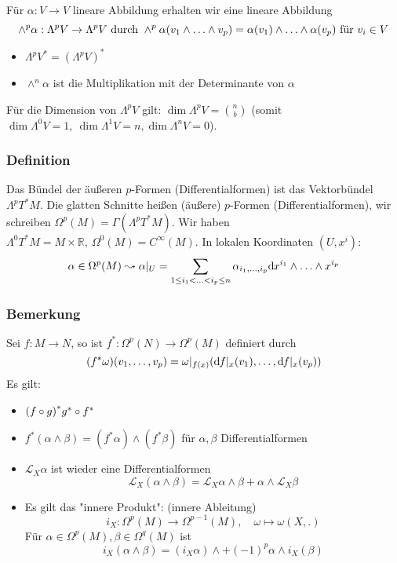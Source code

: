 Für $\alpha: V\to V$ lineare Abbildung erhalten wir eine lineare Abbildung
\[
\wedge^p \alpha: \Lambda^p V \to \Lambda^p V\ \text{durch}\ \wedge^p \alpha\enbrace{v_1\wedge \ldots \wedge v_p} = \alpha(v_1)\wedge \ldots \wedge \alpha(v_p)\ \text{für}\ v_i\in V
\]
\begin{itemize}
\item $\Lambda^p V^* = (\Lambda^p V)^*$
\item $\wedge^n \alpha$ ist die Multiplikation mit der Determinante von $\alpha$
\end{itemize}
Für die Dimension von $\Lambda^p V$ gilt: $\dim \Lambda^p V = \binom{n}{b}$ (somit $\dim \Lambda^0 V = 1,\ \dim \Lambda^1 V = n, \dim \Lambda^n V = 0$).

\subsubsection{Definition}
\label{ssub:189}
Das Bündel der äußeren $p$-Formen (Differentialformen) ist das Vektorbündel $\Lambda^p T^* M$. Die glatten Schnitte heißen (äußere) $p$-Formen (Differentialformen), wir schreiben $\Omega^p (M) = \Gamma(\Lambda^p T^* M)$. Wir haben $\Lambda^0 T^* M = M\times \mathds{R},\ \Omega^0(M) = C^\infty (M)$. In lokalen Koordinaten $(U,x^i)$:
\[\alpha \in \Omega^p (M) \leadsto \alpha\vert_U = \sum_{1\leq i_1 < \ldots < i_p \leq n} \alpha_{i_1,\ldots,i_p} \mathrm{d}\mkern-1.0mu x^{i_1} \wedge \ldots \wedge x^{i_p}\]

\subsubsection{Bemerkung}
\label{ssub:190}
Sei $f:M\to N$, so ist $f^*:\Omega^p(N) \to \Omega^p(M)$ definiert durch
\[
(f^* \omega)(v_1,\ldots,v_p) = \omega\vert_{f(x)} \enbrace*{\mathd f\vert_{x} (v_1),\ldots, \mathd f\vert_{x} (v_p)}
\]
Es gilt:
\begin{itemize}
\item $\enbrace*{f\circ g}^* g^* \circ f^*$
\item $f^*(\alpha \wedge \beta) = (f^* \alpha) \wedge (f^* \beta)$ für $\alpha,\beta$ Differentialformen
\item $\mathcal{L}_X \alpha$ ist wieder eine Differentialformen
\[
\mathcal{L}_X (\alpha \wedge \beta) = \mathcal{L}_X \alpha \wedge \beta + \alpha \wedge \mathcal{L}_X \beta
\]
\item Es gilt das "innere Produkt": (innere Ableitung)
\[
i_X:\Omega^p (M)\to \Omega^{p-1} (M),\quad \omega \mapsto \omega (X,.)
\]
Für $\alpha \in \Omega^p (M), \beta \in \Omega^q (M)$ ist 
\[
i_X(\alpha \wedge \beta) = (i_X \alpha)\wedge + (-1)^p \alpha \wedge i_X(\beta)
\]
\end{itemize}

